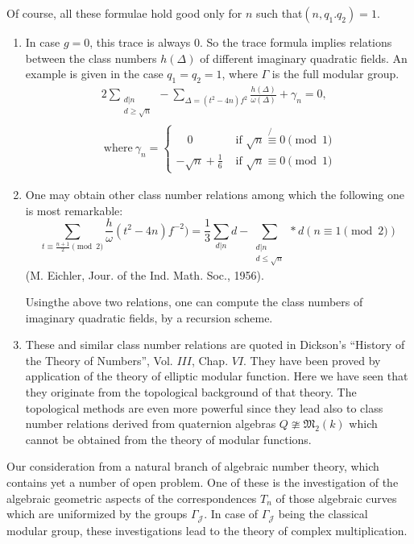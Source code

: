 Of course, all these formulae hold good only for $n$ such that\break $(n,
q_1. q_2) = 1$.  

\begin{note}
\begin{enumerate}[\rm (i)]
\item In case $g = 0$, this trace is always $0$. So the trace formula
  implies relations between the class numbers $h(\Delta)$ of different
  imaginary quadratic fields. An example is given in the case $q_1 =
  q_2 = 1$, where $\Gamma$ is the full modular group. 
  \begin{multline*}
    2 \sum_{\substack { d|n \\ d \geq \sqrt{n}}} - \sum_{\Delta = (t^2 -
      4n)f^2} \frac{h (\Delta)}{\omega(\Delta)}+ \gamma_n = 0,\\ 
    ~\text{where}~ \gamma_n = 
    \begin{cases} 
      \quad 0 & \text{ if } \sqrt{n} \not{\equiv} 0 \pmod 1 \\ 
      -\sqrt{n}+ \frac{1}{6} & \text{ if }\sqrt{n} \equiv 0 \pmod 1 
    \end{cases} 
  \end{multline*}

\item One may obtain other class number relations among which the
  following one is most remarkable: 
  $$
  \sum_{t \equiv \frac{n+1}{2}\pmod 2} \frac{h}{\omega}(t^2 -
  4n)f^{-2})= \frac{1}{3} \sum_{d|n}d - \sum_{\substack{d|n \\{ d \leq
        \sqrt{n}}}} *d (n \equiv 1 \pmod 2) 
  $$
  (M. Eichler, Jour. of the Ind. Math. Soc., 1956).
  
  Using\pageoriginale the above two relations, one can compute the
  class numbers of 
  imaginary quadratic fields, by a recursion scheme. 
\item These and similar class number relations are quoted in Dickson's
  ``History of the Theory of Numbers'', Vol. $III$, Chap. $VI$. They
  have been proved by application of the theory of elliptic modular
  function. Here we have seen that they originate from the topological
  background of that theory. The topological methods are even more
  powerful since they lead also to class number relations derived from
  quaternion algebras $Q \ncong \mathfrak{M}_2 (k)$ which
  cannot be obtained from the theory of modular functions. 
\end{enumerate}
\end{note}

Our consideration from a natural branch of algebraic number theory,
which contains yet a number of open problem. One of these is the
investigation of the algebraic geometric aspects of the
correspondences $T_n$ of those algebraic curves which are uniformized
by the groups $\Gamma_\mathcal{J}$. In case of $\Gamma_{\mathcal{J}}$
being the classical modular group, these investigations lead to the
theory of complex multiplication. 

